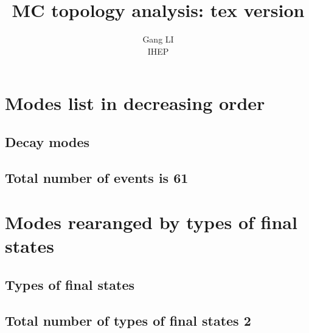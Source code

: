 \documentclass[11pt]{article}
\begin{document}
\title{MC topology analysis: tex version}
\author{Gang LI\\
\small{ IHEP}}
\maketitle

\tableofcontents
\newpage
\section{Modes list in decreasing order}

\subsection{Decay modes }
\begin{landscape}  \end{landscape} \clearpage  

\subsection{Total number of events is 61}

\setcounter{table}{0}

\section{Modes rearanged by types of final states}

\subsection{ Types of final states }
\begin{landscape}  \end{landscape} \clearpage

\subsection{ Total number of types of final states 2}
\end{document}
